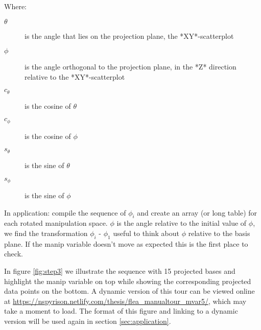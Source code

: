 \documentclass{monashthesis}
\begin{document}
Where:

\begin{description}
  \item[$\theta$] is the angle that lies on the projection plane, the *XY*-scatterplot
  \item[$\phi$] is the angle orthogonal to the projection plane, in the *Z* direction relative to the *XY*-scatterplot
  \item[$c_\theta$] is the cosine of $\theta$
  \item[$c_\phi$]   is the cosine of $\phi$
  \item[$s_\theta$] is the sine of   $\theta$
  \item[$s_\phi$]   is the sine of   $\phi$
\end{description}

In application: compile the sequence of \(\phi_i\) and create an array
(or long table) for each rotated manipulation space. \(\phi\) is the
angle relative to the initial value of \(\phi\), we find the
transformation \(\phi_i\) - \(\phi_1\) useful to think about \(\phi\)
relative to the basis plane. If the manip variable doesn't move as
expected this is the first place to check.

\begin{Shaded}
\begin{Highlighting}[]
 
\StringTok{ }\OperatorTok{+}\StringTok{ }
\StringTok{ }\NormalTok{(manip_space, theta, phi)[, }\OperatorTok{:}\NormalTok{]}
\NormalTok{\}}
\end{Highlighting}
\end{Shaded}

In figure \ref{fig:step3} we illustrate the sequence with 15 projected
bases and highlight the manip variable on top while showing the
corresponding projected data points on the bottom. A dynamic version of
this tour can be viewed online at
\url{https://nspyrison.netlify.com/thesis/flea_manualtour_mvar5/}, which
may take a moment to load. The format of this figure and linking to a
dynamic version will be used again in section \ref{sec:application}.
\end{document}
